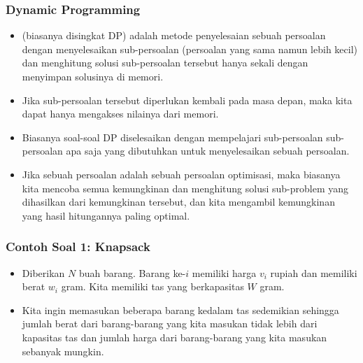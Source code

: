 \begin{frame} 
\frametitle{Dynamic Programming}
\begin{itemize}
  \item {} (biasanya disingkat DP) adalah metode penyelesaian sebuah persoalan dengan menyelesaikan sub-persoalan (persoalan yang sama namun lebih kecil) dan menghitung solusi sub-persoalan tersebut hanya sekali dengan menyimpan solusinya di memori.
  \item Jika sub-persoalan tersebut diperlukan kembali pada masa depan, maka kita dapat hanya mengakses nilainya dari memori.
  \item Biasanya soal-soal DP diselesaikan dengan mempelajari sub-persoalan sub-persoalan apa saja yang dibutuhkan untuk menyelesaikan sebuah persoalan.
  \item Jika sebuah persoalan adalah sebuah persoalan optimisasi, maka biasanya kita mencoba semua kemungkinan dan menghitung solusi sub-problem yang dihasilkan dari kemungkinan tersebut, dan kita mengambil kemungkinan yang hasil hitungannya paling optimal. 
\end{itemize}
\end{frame}

\begin{frame} 
\frametitle{Contoh Soal 1: Knapsack}
\begin{itemize}
  \item Diberikan $N$ buah barang. Barang ke-$i$ memiliki harga $v_i$ rupiah dan memiliki berat $w_i$ gram. Kita memiliki tas yang berkapasitas $W$ gram. 
  \item Kita ingin memasukan beberapa barang kedalam tas sedemikian sehingga jumlah berat dari barang-barang yang kita masukan tidak lebih dari kapasitas tas dan jumlah harga dari barang-barang yang kita masukan sebanyak mungkin.
\end{itemize}
\end{frame}

